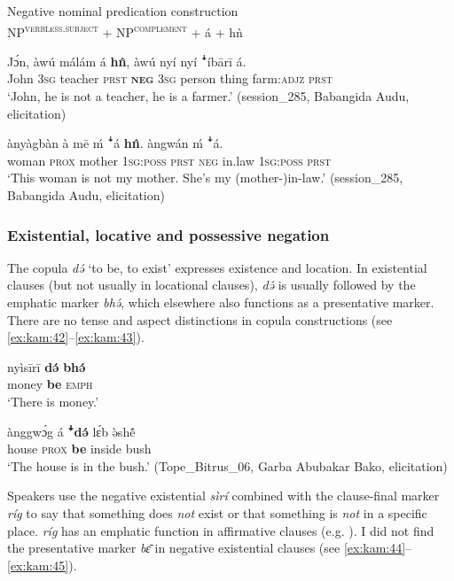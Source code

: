 \documentclass[output=paper,colorlinks,citecolor=brown]{langscibook}
\begin{document}
\ea\label{ex:kam:39} 
    Negative nominal predication construction\\
    NP\textsuperscript{\textsc{verbless.subject}} + NP\textsuperscript{\textsc{complement}} + á + hǹ
\z

\ea\label{ex:kam:40} 
    \gll Jɔ́n, àwú málám á \textbf{h\^{n}}, àwú nyí nyí ꜜíbārī á.\\
        John \textsc{3sg} teacher \textsc{prst} \textbf{\textsc{neg}} \textsc{3sg} person thing farm:\textsc{adjz} \textsc{prst}\\
    \glt ‘John, he is not a teacher, he is a farmer.’ (session\_285, Babangida Audu, elicitation)\\
\z 

\ea\label{ex:kam:41} 
    \gll ànyàgbàn à mē ḿ ꜜá \textbf{h\^{n}}. àngwán ḿ ꜜá.\\
        woman \textsc{prox} mother \textsc{1sg:poss} \textsc{prst} \textsc{neg} in.law \textsc{1sg:poss} \textsc{prst}\\
    \glt ‘This woman is not my mother. She’s my (mother-)in-law.’ (session\_285, Babangida Audu, elicitation)
\z 
\subsubsection{Existential, locative and possessive negation}\label{sec:kam:2.3.2}

The copula \textit{də́} ‘to be, to exist’ expresses existence and location. In existential clauses (but not usually in locational clauses), \textit{də́} is usually followed by the emphatic marker \textit{bhə́}, which elsewhere also functions as a presentative marker. There are no tense and aspect distinctions in copula constructions (see \ref{ex:kam:42}--\ref{ex:kam:43}).

\ea\label{ex:kam:42} 
    \gll nyìsīrī \textbf{də́} \textbf{bhə́}\\ 
        money \textbf{be} \textsc{emph}\\
    \glt ‘There is money.’
\z 

\ea\label{ex:kam:43} 
    \gll ànggwɔ́g á \textbf{ꜜdə́} lɛ́b ə̀sh\'{ẽ} \\
        house \textsc{prox} \textbf{be} inside bush\\
    \glt ‘The house is in the bush.’ (Tope\_Bitrus\_06, Garba Abubakar Bako, elicitation)
\z 

Speakers use the negative existential \textit{sìrí} combined with the clause-final mar\-ker \textit{ríg} to say that something does \textit{not} exist or that something is \textit{not} in a specific place. \textit{ríg} has an emphatic function in affirmative clauses (e.g. ). I did not find the presentative marker \textit{bɛ̄} in negative existential clauses (see \ref{ex:kam:44}--\ref{ex:kam:45}).
\end{document}
